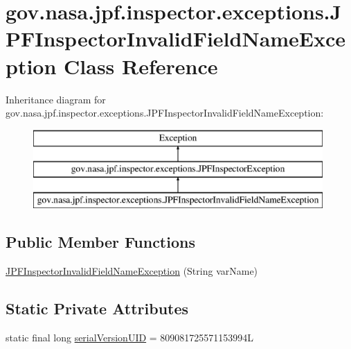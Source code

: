 \hypertarget{classgov_1_1nasa_1_1jpf_1_1inspector_1_1exceptions_1_1_j_p_f_inspector_invalid_field_name_exception}{}\section{gov.\+nasa.\+jpf.\+inspector.\+exceptions.\+J\+P\+F\+Inspector\+Invalid\+Field\+Name\+Exception Class Reference}
\label{classgov_1_1nasa_1_1jpf_1_1inspector_1_1exceptions_1_1_j_p_f_inspector_invalid_field_name_exception}
Inheritance diagram for gov.\+nasa.\+jpf.\+inspector.\+exceptions.\+J\+P\+F\+Inspector\+Invalid\+Field\+Name\+Exception\+:\begin{figure}[H]
\begin{center}
\leavevmode
\includegraphics[height=3.000000cm]{classgov_1_1nasa_1_1jpf_1_1inspector_1_1exceptions_1_1_j_p_f_inspector_invalid_field_name_exception}
\end{center}
\end{figure}
\subsection*{Public Member Functions}
\begin{DoxyCompactItemize}
\item 
\hyperlink{classgov_1_1nasa_1_1jpf_1_1inspector_1_1exceptions_1_1_j_p_f_inspector_invalid_field_name_exception_a8fd8034283a6a19404765b5fad8b6125}{J\+P\+F\+Inspector\+Invalid\+Field\+Name\+Exception} (String var\+Name)
\end{DoxyCompactItemize}
\subsection*{Static Private Attributes}
\begin{DoxyCompactItemize}
\item 
static final long \hyperlink{classgov_1_1nasa_1_1jpf_1_1inspector_1_1exceptions_1_1_j_p_f_inspector_invalid_field_name_exception_a1722d817f1bc0a1b6d91a54ab152cd30}{serial\+Version\+U\+ID} = 809081725571153994L
\end{DoxyCompactItemize}


